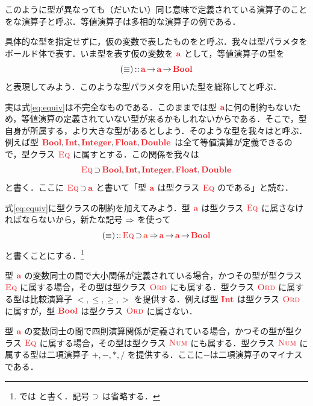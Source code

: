 \documentclass[a5paper,twoside,fleqn,draft]{jsbook}
\begin{document}
このように型が異なっても（だいたい）同じ意味で定義されている演算子のことをな演算子と呼ぶ．等値演算子は多相的な演算子の例である．

具体的な型を指定せずに，仮の変数で表したものをと呼ぶ．我々は型パラメタをボールド体で表す．いま型を表す仮の変数を $\hTypeName{a}$ として，等値演算子の型を
\begin{equation}
  \label{eq:equiv}
  (\hIfEq)
  \hIsTypeOf\hTypeName{a}\hFunctionArrow\hTypeName{a}\hFunctionArrow\hBool
\end{equation}
と表現してみよう．このような型パラメタを用いた型を総称してと呼ぶ．

実は式\eqref{eq:equiv}は不完全なものである．このままでは型 $\hTypeName{a}$に何の制約もないため，等値演算の定義されていない型が来るかもしれないからである．そこで，型自身が所属する，より大きな型があるとしよう．そのような型を我々はと呼ぶ．例えば型 $\hBool,\hInt,\hInteger,\hFloat,\hDouble$ は全て等値演算が定義できるので，型クラス $\hEq$ に属すとする．この関係を我々は
\begin{equation}
  \hEq
  \hHasElementsOf\hBool,\hInt,\hInteger,\hFloat,\hDouble
\end{equation}
と書く．ここに $\hEq\hHasElementsOf\hTypeName{a}$ と書いて「型 $\hTypeName{a}$ は型クラス $\hEq$ のである」と読む．

式\eqref{eq:equiv}に型クラスの制約を加えてみよう．型 $\hTypeName{a}$ は型クラス $\hEq$ に属さなければならないから，新たな記号 $\operatorname{\Rightarrow}$ を使って
\begin{equation}
  (\hIfEq)
  \hIsTypeOf{}\hEq\hHasElementsOf\mA
  \hAndThen\hTypeName{a}\hFunctionArrow\hTypeName{a}\hFunctionArrow\hBool
\end{equation}
と書くことにする．\footnote{\haskell では  と書く．記号 $\operatorname{\supset}$ は省略する．}

型 $\hTypeName{a}$ の変数同士の間で大小関係が定義されている場合，かつその型が型クラス $\hEq$ に属する場合，その型は型クラス $\hOrd$ にも属する．型クラス $\hOrd$ に属する型は比較演算子 $<,\le,\ge,>$ を提供する．例えば型 $\hInt$ は型クラス $\hOrd$ に属すが，型 $\hBool$ は型クラス $\hOrd$ に属さない．

型 $\hTypeName{a}$ の変数同士の間で四則演算関係が定義されている場合，かつその型が型クラス $\hEq$ に属する場合，その型は型クラス $\hNum$ にも属する．型クラス $\hNum$ に属する型は二項演算子 $+,-,*,/$ を提供する．ここに$-$は二項演算子のマイナスである．
\end{document}
